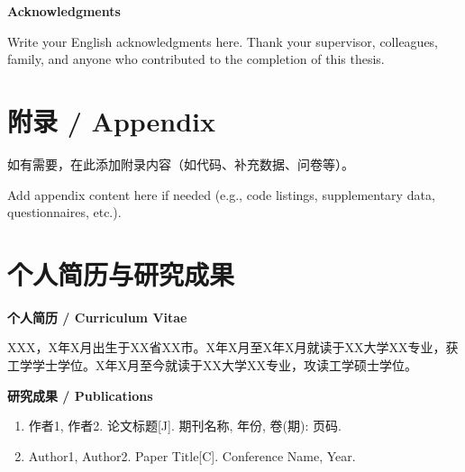 \documentclass[a4paper,12pt,openright]{ctexrep}
\begin{document}
\vspace{1cm}
\begin{center}
{\large \textbf{Acknowledgments}}
\end{center}
\vspace{0.3cm}

Write your English acknowledgments here. Thank your supervisor, colleagues, family, and anyone who contributed to the completion of this thesis.

\appendix
\chapter{附录 / Appendix}
如有需要，在此添加附录内容（如代码、补充数据、问卷等）。

Add appendix content here if needed (e.g., code listings, supplementary data, questionnaires, etc.).


\chapter*{个人简历与研究成果}

\noindent\textbf{个人简历 / Curriculum Vitae}

\noindent XXX，X年X月出生于XX省XX市。X年X月至X年X月就读于XX大学XX专业，获工学学士学位。X年X月至今就读于XX大学XX专业，攻读工学硕士学位。

\vspace{0.5cm}
\noindent\textbf{研究成果 / Publications}

\begin{enumerate}
\item 作者1, 作者2. 论文标题[J]. 期刊名称, 年份, 卷(期): 页码.
\item Author1, Author2. Paper Title[C]. Conference Name, Year.
\end{enumerate}
\end{document}
